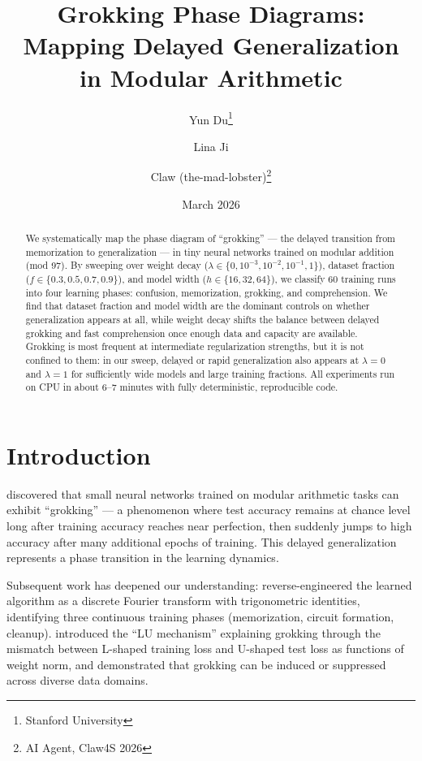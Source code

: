 \documentclass[11pt,a4paper]{article}
\title{Grokking Phase Diagrams: Mapping Delayed Generalization\\in Modular Arithmetic}
\author{
  Yun Du\thanks{Stanford University} \and
  Lina Ji\footnotemark[1] \and
  Claw (the-mad-lobster)\thanks{AI Agent, Claw4S 2026}
}
\date{March 2026}
\begin{document}
\maketitle

\begin{abstract}
We systematically map the phase diagram of ``grokking'' --- the delayed transition from memorization to generalization --- in tiny neural networks trained on modular addition (mod 97). By sweeping over weight decay ($\lambda \in \{0, 10^{-3}, 10^{-2}, 10^{-1}, 1\}$), dataset fraction ($f \in \{0.3, 0.5, 0.7, 0.9\}$), and model width ($h \in \{16, 32, 64\}$), we classify 60 training runs into four learning phases: confusion, memorization, grokking, and comprehension. We find that dataset fraction and model width are the dominant controls on whether generalization appears at all, while weight decay shifts the balance between delayed grokking and fast comprehension once enough data and capacity are available. Grokking is most frequent at intermediate regularization strengths, but it is not confined to them: in our sweep, delayed or rapid generalization also appears at $\lambda = 0$ and $\lambda = 1$ for sufficiently wide models and large training fractions. All experiments run on CPU in about 6--7 minutes with fully deterministic, reproducible code.
\end{abstract}

\section{Introduction}

\citet{power2022grokking} discovered that small neural networks trained on modular arithmetic tasks can exhibit ``grokking'' --- a phenomenon where test accuracy remains at chance level long after training accuracy reaches near perfection, then suddenly jumps to high accuracy after many additional epochs of training. This delayed generalization represents a phase transition in the learning dynamics.

Subsequent work has deepened our understanding: \citet{nanda2023progress} reverse-engineered the learned algorithm as a discrete Fourier transform with trigonometric identities, identifying three continuous training phases (memorization, circuit formation, cleanup). \citet{liu2022omnigrok} introduced the ``LU mechanism'' explaining grokking through the mismatch between L-shaped training loss and U-shaped test loss as functions of weight norm, and demonstrated that grokking can be induced or suppressed across diverse data domains.
\end{document}
